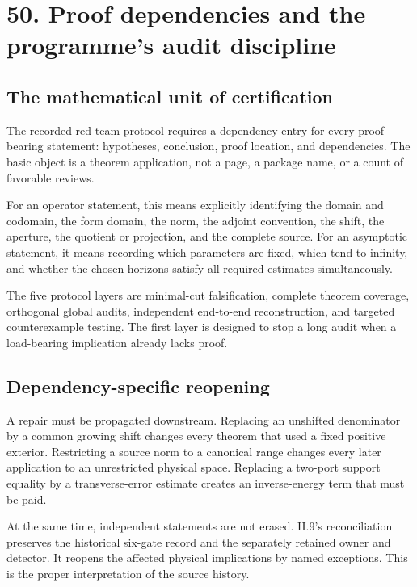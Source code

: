 \documentclass[
  10pt,
  a4paper,
  10pt,
  oneside,
  openany]{book}
\begin{document}
\section{50. Proof dependencies and the programme's audit
discipline}\label{ch-audit}

\subsection{The mathematical unit of
certification}\label{the-mathematical-unit-of-certification}

The recorded red-team protocol requires a dependency entry for every
proof-bearing statement: hypotheses, conclusion, proof location, and
dependencies. The basic object is a theorem application, not a page, a
package name, or a count of favorable reviews.

For an operator statement, this means explicitly identifying the domain
and codomain, the form domain, the norm, the adjoint convention, the
shift, the aperture, the quotient or projection, and the complete
source. For an asymptotic statement, it means recording which parameters
are fixed, which tend to infinity, and whether the chosen horizons
satisfy all required estimates simultaneously.

The five protocol layers are minimal-cut falsification, complete theorem
coverage, orthogonal global audits, independent end-to-end
reconstruction, and targeted counterexample testing. The first layer is
designed to stop a long audit when a load-bearing implication already
lacks proof.

\subsection{Dependency-specific
reopening}\label{dependency-specific-reopening}

A repair must be propagated downstream. Replacing an unshifted
denominator by a common growing shift changes every theorem that used a
fixed positive exterior. Restricting a source norm to a canonical range
changes every later application to an unrestricted physical space.
Replacing a two-port support equality by a transverse-error estimate
creates an inverse-energy term that must be paid.

At the same time, independent statements are not erased. II.9's
reconciliation preserves the historical six-gate record and the
separately retained owner and detector. It reopens the affected physical
implications by named exceptions. This is the proper interpretation of
the source history.
\end{document}
